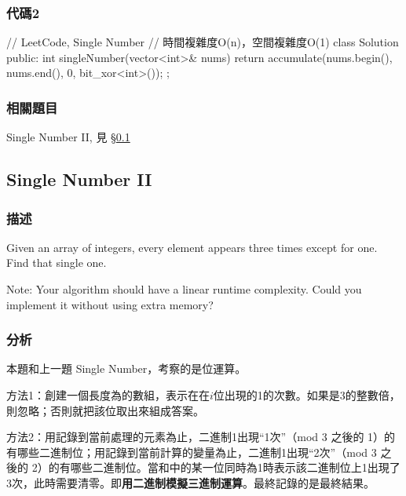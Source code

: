 \subsubsection{代碼2}
\begin{Code}
// LeetCode, Single Number
// 時間複雜度O(n)，空間複雜度O(1)
class Solution {
public:
    int singleNumber(vector<int>& nums) {
        return accumulate(nums.begin(), nums.end(), 0, bit_xor<int>());
    }
};
\end{Code}


\subsubsection{相關題目}
\begindot
\item  Single Number II, 見 \S \ref{sec:single-number-ii}
\myenddot


\subsection{Single Number II} %
\label{sec:single-number-ii}


\subsubsection{描述}
Given an array of integers, every element appears three times except for one. Find that single one.

Note:
Your algorithm should have a linear runtime complexity. Could you implement it without using extra memory?


\subsubsection{分析}
本題和上一題 Single Number，考察的是位運算。

方法1：創建一個長度為的數組，表示在在$i$位出現的1的次數。如果是3的整數倍，則忽略；否則就把該位取出來組成答案。

方法2：用記錄到當前處理的元素為止，二進制1出現“1次”（mod 3 之後的 1）的有哪些二進制位；用記錄到當前計算的變量為止，二進制1出現“2次”（mod 3 之後的 2）的有哪些二進制位。當和中的某一位同時為1時表示該二進制位上1出現了3次，此時需要清零。即\textbf{用二進制模擬三進制運算}。最終記錄的是最終結果。

